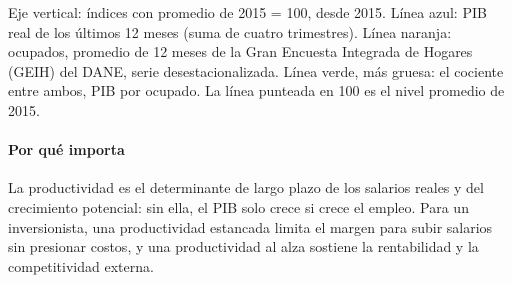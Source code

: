 \begin{leer}
Eje vertical: índices con promedio de 2015 = 100, desde 2015. Línea azul: PIB real de los últimos 12 meses (suma de cuatro trimestres). Línea naranja: ocupados, promedio de 12 meses de la Gran Encuesta Integrada de Hogares (GEIH) del DANE, serie desestacionalizada. Línea verde, más gruesa: el cociente entre ambos, PIB por ocupado. La línea punteada en 100 es el nivel promedio de 2015.
\end{leer}

\paragraph{Por qué importa}
La productividad es el determinante de largo plazo de los salarios reales y del crecimiento potencial: sin ella, el PIB solo crece si crece el empleo. Para un inversionista, una productividad estancada limita el margen para subir salarios sin presionar costos, y una productividad al alza sostiene la rentabilidad y la competitividad externa.

